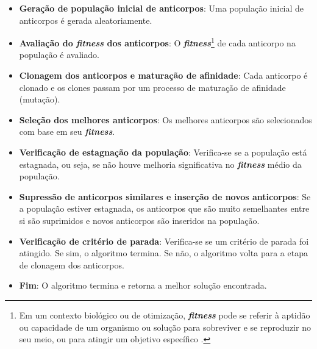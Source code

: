 \begin{itemize}
    \item \textbf{Geração de população inicial de anticorpos}: Uma população inicial de anticorpos é gerada aleatoriamente.
    
    \item \textbf{Avaliação do \textit{fitness} dos anticorpos}: O \textbf{\textit{fitness}}\footnote{Em um contexto biológico ou de otimização, \textbf{\textit{fitness}} pode se referir à aptidão ou capacidade de um organismo ou solução para sobreviver e se reproduzir no seu meio, ou para atingir um objetivo específico \cite{fitness2024}.} de cada anticorpo na população é avaliado.
    
    \item \textbf{Clonagem dos anticorpos e maturação de afinidade}: Cada anticorpo é clonado e os clones passam por um processo de maturação de afinidade (mutação).
    
    \item \textbf{Seleção dos melhores anticorpos}: Os melhores anticorpos são selecionados com base em seu \textbf{\textit{fitness}}.
    
    \item \textbf{Verificação de estagnação da população}: Verifica-se se a população está estagnada, ou seja, se não houve melhoria significativa no \textbf{\textit{fitness}} médio da população.
    
    \item \textbf{Supressão de anticorpos similares e inserção de novos anticorpos}: Se a população estiver estagnada, os anticorpos que são muito semelhantes entre si são suprimidos e novos anticorpos são inseridos na população.
    
    \item \textbf{Verificação de critério de parada}: Verifica-se se um critério de parada foi atingido. Se sim, o algoritmo termina. Se não, o algoritmo volta para a etapa de clonagem dos anticorpos.
    
    \item \textbf{Fim}: O algoritmo termina e retorna a melhor solução encontrada.
\end{itemize}

\newpage
\thispagestyle{mystyle}

